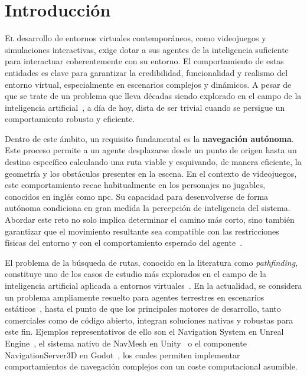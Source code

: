 \chapter{Introducción}

\lettrine{E}{l} desarrollo de entornos virtuales contemporáneos, como videojuegos y simulaciones interactivas, exige dotar a sus agentes de la inteligencia suficiente para interactuar coherentemente con su entorno.
El comportamiento de estas entidades es clave para garantizar la credibilidad, funcionalidad y realismo del entorno virtual, especialmente en escenarios complejos y dinámicos.
A pesar de que se trate de un problema que lleva décadas siendo explorado en el campo de la inteligencia artificial~\cite{russell1995modern}, a día de hoy, dista de ser trivial cuando se persigue un comportamiento robusto y eficiente.

Dentro de este ámbito, un requisito fundamental es la \textbf{navegación autónoma}.
Este proceso permite a un agente desplazarse desde un punto de origen hasta un destino específico calculando una ruta viable y esquivando, de manera eficiente, la geometría y los obstáculos presentes en la escena.
En el contexto de videojuegos, este comportamiento recae habitualmente en los personajes no jugables, conocidos en inglés como \acrfull{npc}.
Su capacidad para desenvolverse de forma autónoma condiciona en gran medida la percepción de inteligencia del sistema. 
Abordar este reto no solo implica determinar el camino más corto, sino también garantizar que el movimiento resultante sea compatible con las restricciones físicas del entorno y con el comportamiento esperado del agente~\cite{reynolds1999steering}.

El problema de la búsqueda de rutas, conocido en la literatura como \textit{pathfinding}, constituye uno de los casos de estudio más explorados en el campo de la inteligencia artificial aplicada a entornos virtuales~\cite{Millington}.
En la actualidad, se considera un problema ampliamente resuelto para agentes terrestres en escenarios estáticos~\cite{abd2015comprehensive}, hasta el punto de que los principales motores de desarrollo, tanto comerciales como de código abierto, integran soluciones nativas y robustas para este fin.
Ejemplos representativos de ello son el Navigation System en Unreal Engine~\cite{UnrealNavSystem}, el sistema nativo de NavMesh en Unity~\cite{UnityNavMesh} o el componente NavigationServer3D en Godot~\cite{GodotNavServer}, los cuales permiten implementar comportamientos de navegación complejos con un coste computacional asumible.

